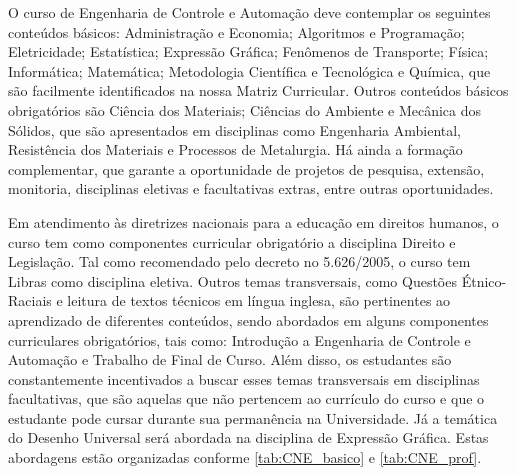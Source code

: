 \documentclass[
	12pt,				%
	openright,			%
	oneside,			%
	a4paper,			%
	english,			%
	brazil				%
	]{abntex2}
\begin{document}
O curso de Engenharia de Controle e Automação deve contemplar os seguintes conteúdos básicos: Administração e Economia; Algoritmos e Programação; Eletricidade; Estatística; Expressão Gráfica; Fenômenos de Transporte; Física; Informática; Matemática; Metodologia Científica e Tecnológica e Química, que são facilmente identificados na nossa Matriz Curricular. Outros conteúdos básicos obrigatórios são Ciência dos Materiais; Ciências do Ambiente e Mecânica dos Sólidos, que são apresentados em disciplinas como Engenharia Ambiental, Resistência dos Materiais e Processos de Metalurgia. Há ainda a formação complementar, que garante a oportunidade de projetos de pesquisa, extensão, monitoria, disciplinas eletivas e facultativas extras, entre outras oportunidades.


Em atendimento às diretrizes nacionais para a educação em direitos humanos, o curso tem como componentes curricular obrigatório a disciplina Direito e Legislação. Tal como recomendado pelo decreto no 5.626/2005, o curso tem Libras como disciplina eletiva. Outros temas transversais, como Questões Étnico-Raciais e leitura de textos técnicos em língua inglesa, são pertinentes ao aprendizado de diferentes conteúdos, sendo abordados em alguns componentes curriculares obrigatórios, tais como: Introdução a Engenharia de Controle e Automação e Trabalho de Final de Curso. Além disso, os estudantes são constantemente incentivados a buscar esses temas transversais em disciplinas facultativas, que são aquelas que não pertencem ao currículo do curso e que o estudante pode cursar durante sua permanência na Universidade. Já a temática do Desenho Universal será abordada na disciplina de Expressão Gráfica. Estas abordagens estão organizadas conforme \autoref{tab:CNE_basico} e \autoref{tab:CNE_prof}.
\end{document}
